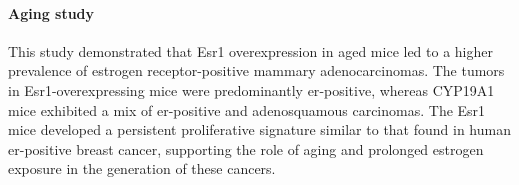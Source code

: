 \paragraph{Aging study}
This study demonstrated that Esr1 overexpression in aged mice led to a higher
prevalence of estrogen receptor-positive mammary adenocarcinomas.
The tumors in Esr1-overexpressing mice were predominantly \gls{er}-positive,
whereas CYP19A1 mice exhibited a mix of \gls{er}-positive and adenosquamous
carcinomas.
The Esr1 mice developed a persistent proliferative signature similar to that
found in human \gls{er}-positive breast cancer, supporting the role of aging
and prolonged estrogen exposure in the generation of these
cancers\supercite{furth_overexpression_2023}.
